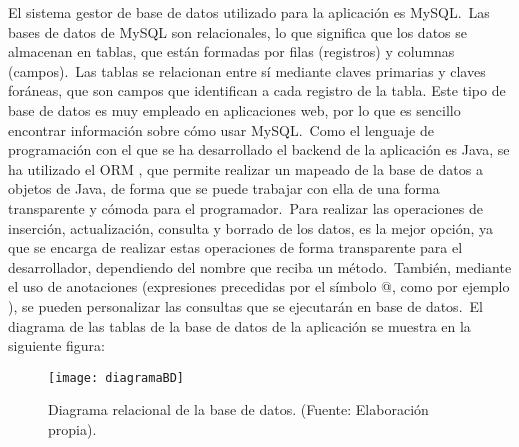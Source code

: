 
El sistema gestor de base de datos utilizado para la aplicación es MySQL.\ Las bases de datos de MySQL son
relacionales, lo que significa que los datos se almacenan en tablas, que están formadas por filas (registros) y columnas
(campos).\ Las tablas se relacionan entre sí mediante claves primarias y claves foráneas, que son campos que
identifican a cada registro de la tabla.
Este tipo de base de datos es muy empleado en aplicaciones web, por lo que es sencillo encontrar información sobre
cómo usar MySQL\@.\ Como el lenguaje de programación con el que se ha desarrollado el backend de la aplicación es
Java, se ha utilizado el ORM , que permite realizar un mapeado de la base de datos a objetos de
Java, de forma que se puede trabajar con ella de una forma transparente y cómoda para el programador.\ Para realizar
las operaciones de inserción, actualización, consulta y borrado de los datos,  es la
mejor opción, ya que se encarga de realizar estas operaciones de forma transparente para el desarrollador,
dependiendo del nombre que reciba un método.\ También, mediante el uso de anotaciones (expresiones precedidas por el
símbolo @, como por ejemplo ), se pueden personalizar las consultas que se ejecutarán en base de
datos.\ El diagrama de las tablas de la base de datos de la aplicación se muestra en la siguiente figura:

\begin{figure}[H]
	\centering
	\texttt{[image: diagramaBD]}
	\caption{Diagrama relacional de la base de datos. (Fuente: Elaboración propia).}
	\label{fig:diagrama-tablas}
\end{figure}
